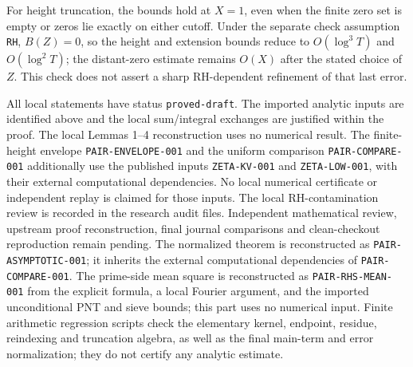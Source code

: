 \documentclass[11pt]{article}
\begin{document}
For height truncation, the bounds hold at \(X=1\), even when the
finite zero set is empty or zeros lie exactly on either cutoff.
Under the separate check assumption \texttt{RH}, \(B(Z)=0\), so
the height and extension bounds reduce to \(O(\log^3T)\) and
\(O(\log^2T)\); the distant-zero estimate remains \(O(X)\) after
the stated choice of \(Z\). This check does not assert a sharp
RH-dependent refinement of that last error.

All local statements have status \texttt{proved-draft}. The imported
analytic inputs are identified above and the local sum/integral exchanges
are justified within the proof. The local Lemmas 1--4 reconstruction
uses no numerical result. The finite-height envelope
\texttt{PAIR-ENVELOPE-001} and the uniform comparison
\texttt{PAIR-COMPARE-001} additionally use the published inputs
\texttt{ZETA-KV-001} and \texttt{ZETA-LOW-001}, with their external
computational dependencies. No local numerical certificate or
independent replay is claimed for those inputs.
The local RH-contamination review is recorded in the research audit files.
Independent mathematical review, upstream proof reconstruction, final
journal comparisons and clean-checkout reproduction remain pending.
The normalized theorem is reconstructed as
\texttt{PAIR-ASYMPTOTIC-001}; it inherits the external computational
dependencies of \texttt{PAIR-COMPARE-001}.
The prime-side mean square is reconstructed as \texttt{PAIR-RHS-MEAN-001}
from the explicit formula, a local Fourier argument, and the imported
unconditional PNT and sieve bounds; this part uses no numerical input.
Finite arithmetic regression scripts check
the elementary kernel, endpoint, residue, reindexing and truncation
algebra, as well as the final main-term and error normalization;
they do not certify any analytic estimate.



\end{document}
